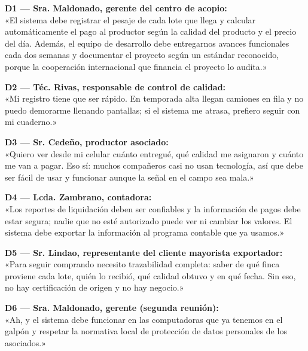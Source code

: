 \documentclass[11pt]{article}
\begin{document}
\begin{tcolorbox}[colback=boxgray,colframe=utegreen,boxrule=0.8pt,arc=2mm]
\textbf{D1 --- Sra. Maldonado, gerente del centro de acopio:}\\
«El sistema debe registrar el pesaje de cada lote que llega y calcular automáticamente el pago al productor según la calidad del producto y el precio del día. Además, el equipo de desarrollo debe entregarnos avances funcionales cada dos semanas y documentar el proyecto según un estándar reconocido, porque la cooperación internacional que financia el proyecto lo audita.»

\vspace{4pt}
\textbf{D2 --- Téc. Rivas, responsable de control de calidad:}\\
«Mi registro tiene que ser rápido. En temporada alta llegan camiones en fila y no puedo demorarme llenando pantallas; si el sistema me atrasa, prefiero seguir con mi cuaderno.»

\vspace{4pt}
\textbf{D3 --- Sr. Cedeño, productor asociado:}\\
«Quiero ver desde mi celular cuánto entregué, qué calidad me asignaron y cuánto me van a pagar. Eso sí: muchos compañeros casi no usan tecnología, así que debe ser fácil de usar y funcionar aunque la señal en el campo sea mala.»

\vspace{4pt}
\textbf{D4 --- Lcda. Zambrano, contadora:}\\
«Los reportes de liquidación deben ser confiables y la información de pagos debe estar segura; nadie que no esté autorizado puede ver ni cambiar los valores. El sistema debe exportar la información al programa contable que ya usamos.»

\vspace{4pt}
\textbf{D5 --- Sr. Lindao, representante del cliente mayorista exportador:}\\
«Para seguir comprando necesito trazabilidad completa: saber de qué finca proviene cada lote, quién lo recibió, qué calidad obtuvo y en qué fecha. Sin eso, no hay certificación de origen y no hay negocio.»

\vspace{4pt}
\textbf{D6 --- Sra. Maldonado, gerente (segunda reunión):}\\
«Ah, y el sistema debe funcionar en las computadoras que ya tenemos en el galpón y respetar la normativa local de protección de datos personales de los asociados.»
\end{tcolorbox}
\end{document}
